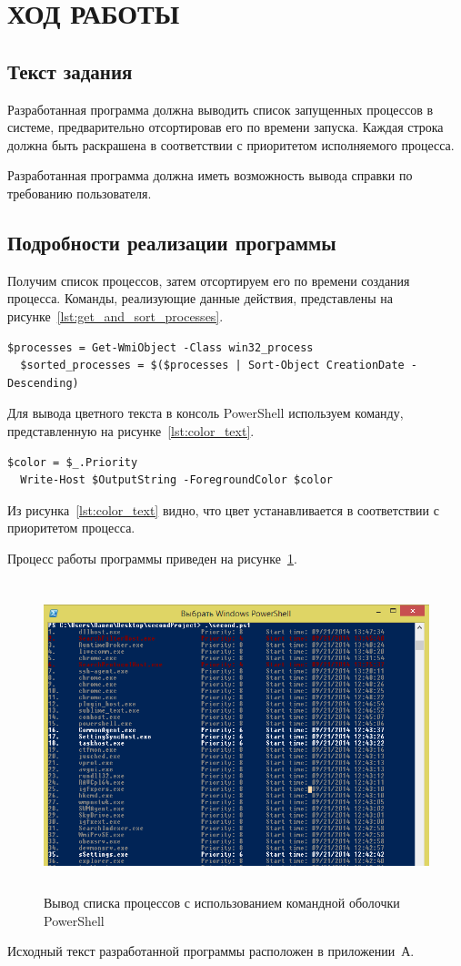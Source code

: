 \section{ХОД РАБОТЫ}

\subsection{Текст задания}

Разработанная программа должна выводить список запущенных процессов в системе,
предварительно отсортировав его по времени запуска. Каждая строка
должна быть раскрашена в соответствии с приоритетом исполняемого процесса.

Разработанная программа должна иметь возможность вывода справки по требованию пользователя.

\subsection{Подробности реализации программы}

Получим список процессов, затем отсортируем его по времени создания процесса.
Команды, реализующие данные действия, представлены на рисунке~\ref{lst:get_and_sort_processes}.

\begin{lstlisting}[caption=Получение и сортировка списка запущенных процессов, label=lst:get_and_sort_processes]
  $processes = Get-WmiObject -Class win32_process
  $sorted_processes = $($processes | Sort-Object CreationDate -Descending)
\end{lstlisting}

Для вывода цветного текста в консоль PowerShell используем команду, представленную на рисунке~\ref{lst:color_text}.
\begin{lstlisting}[caption=Вывод цветного текста в консоль PowerShell, label=lst:color_text]
  $color = $_.Priority
  Write-Host $OutputString -ForegroundColor $color
\end{lstlisting}

Из рисунка~\ref{lst:color_text} видно, что цвет устанавливается в соответствии с приоритетом процесса.

\newpage
Процесс работы программы приведен на рисунке~\ref{fig:process}.

\begin{figure}[htbp]
  \centering
  \includegraphics[width=150mm,height=90mm]{img/process}
  \caption{Вывод списка процессов с использованием командной оболочки PowerShell}\label{fig:process}
\end{figure}

Исходный текст разработанной программы расположен в приложении~А.

\newpage
